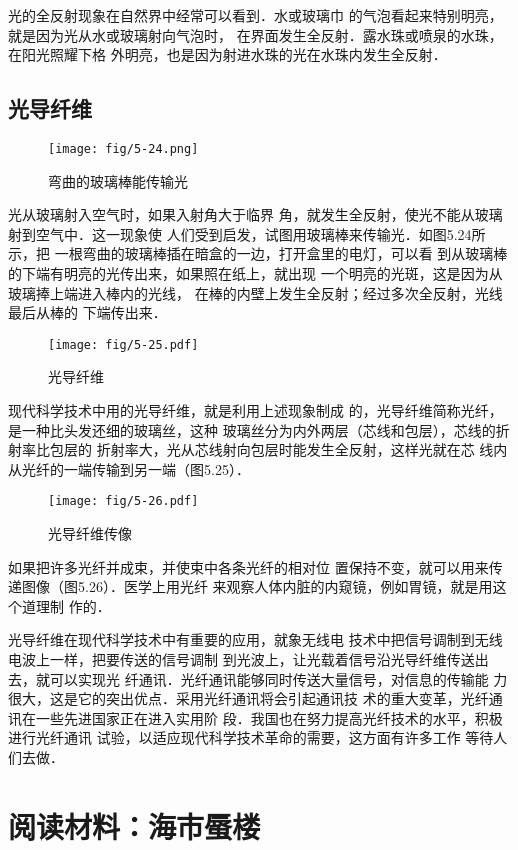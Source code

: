 光的全反射现象在自然界中经常可以看到．水或玻璃巾
的气泡看起来特别明亮，就是因为光从水或玻璃射向气泡时，
在界面发生全反射．露水珠或喷泉的水珠，在阳光照耀下格
外明亮，也是因为射进水珠的光在水珠内发生全反射．

\subsection{光导纤维}
\begin{figure}[htp]\centering
    \texttt{[image: fig/5-24.png]}
    \caption{弯曲的玻璃棒能传输光}
    \end{figure}

光从玻璃射入空气时，如果入射角大于临界
角，就发生全反射，使光不能从玻璃射到空气中．这一现象使
人们受到启发，试图用玻璃棒来传输光．如图5.24所示，把
一根弯曲的玻璃棒插在暗盒的一边，打开盒里的电灯，可以看
到从玻璃棒的下端有明亮的光传出来，如果照在纸上，就出现
一个明亮的光斑，这是因为从玻璃捧上端进入棒内的光线，
在棒的内壁上发生全反射；经过多次全反射，光线最后从棒的
下端传出来．
\begin{figure}[htp]\centering
    \texttt{[image: fig/5-25.pdf]}
    \caption{光导纤维}
    \end{figure}

现代科学技术中用的光导纤维，就是利用上述现象制成
的，光导纤维简称光纤，是一种比头发还细的玻璃丝，这种
玻璃丝分为内外两层（芯线和包层），芯线的折射率比包层的
折射率大，光从芯线射向包层时能发生全反射，这样光就在芯
线内从光纤的一端传输到另一端（图5.25）．
\begin{figure}[htp]\centering
    \texttt{[image: fig/5-26.pdf]}
    \caption{光导纤维传像}
    \end{figure}

如果把许多光纤并成束，并使束中各条光纤的相对位
置保持不变，就可以用来传递图像（图5.26）．医学上用光纤
来观察人体内脏的内窥镜，例如胃镜，就是用这个道理制
作的．

光导纤维在现代科学技术中有重要的应用，就象无线电
技术中把信号调制到无线电波上一样，把要传送的信号调制
到光波上，让光载着信号沿光导纤维传送出去，就可以实现光
纤通讯．光纤通讯能够同时传送大量信号，对信息的传输能
力很大，这是它的突出优点．采用光纤通讯将会引起通讯技
术的重大变革，光纤通讯在一些先进国家正在进入实用阶
段．我国也在努力提高光纤技术的水平，积极进行光纤通讯
试验，以适应现代科学技术革命的需要，这方面有许多工作
等待人们去做．

\section*{阅读材料：海市蜃楼}

